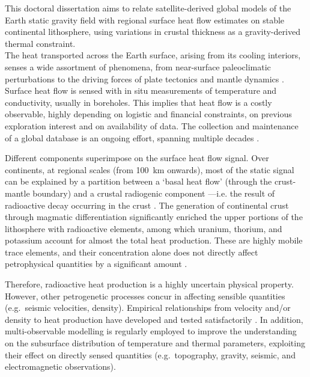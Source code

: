 This doctoral dissertation aims to relate satellite-derived global models of the Earth static gravity field with regional surface heat flow estimates on stable continental lithosphere, using variations in crustal thickness as a gravity-derived thermal constraint.
\\

The heat transported across the Earth surface, arising from its cooling interiors, senses a wide assortment of phenomena, from near-surface paleoclimatic perturbations \parencite{Majorowicz2011} to the driving forces of plate tectonics and mantle dynamics \parencite{Cooper2017}.
Surface heat flow is sensed with in situ measurements of temperature and conductivity, usually in boreholes.
This implies that heat flow is a costly observable, highly depending on logistic and financial constraints, on previous exploration interest and on availability of data.
The collection and maintenance of a global database is an ongoing effort, spanning multiple decades \parencites{Lee1965}{Hasterok2008}.

Different components superimpose on the surface heat flow signal.
Over continents, at regional scales (from \SI{100}{\kilo \metre} onwards), most of the static signal can be explained by a partition between a `basal heat flow' (through the crust-mantle boundary) and a crustal radiogenic component ---i.e. the result of radioactive decay occurring in the crust \parencite{Jaupart2016}.
The generation of continental crust through magmatic differentiation significantly enriched the upper portions of the lithosphere with radioactive elements, among which uranium, thorium, and potassium account for almost the total heat production.
These are highly mobile trace elements, and their concentration alone does not directly affect petrophysical quantities by a significant amount \parencite{Hasterok2017_mis}.

Therefore, radioactive heat production is a highly uncertain physical property.
However, other petrogenetic processes concur in affecting sensible quantities (e.g.~seismic velocities, density).
Empirical relationships from velocity and/or density to heat production have developed and tested satisfactorily \parencites{Rudnick2003}{Vila2010}{Hasterok2017_ign}.
In addition, multi-observable modelling \parencites[e.g.][]{Mather2018}{Afonso2019} is regularly employed to improve the understanding on the subsurface distribution of temperature and thermal parameters, exploiting their effect on directly sensed quantities (e.g.~topography, gravity, seismic, and electromagnetic observations).
\\


